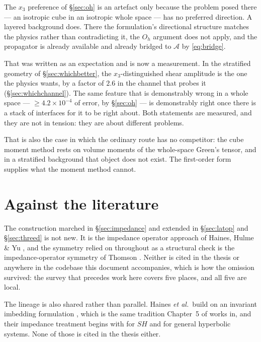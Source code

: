 \documentclass[11pt,a4paper]{article}
\newcommand{\Aop}{\mathcal{A}}
\newcommand{\Oh}{O_{h}}
\begin{document}
The $x_3$ preference of \S\ref{sec:oh} is an artefact only because the problem
posed there --- an isotropic cube in an isotropic whole space --- has no
preferred direction.  A layered background does.  There the formulation's
directional structure matches the physics rather than contradicting it, the
$\Oh$ argument does not apply, and the propagator is already available and
already bridged to $\Aop$ by \eqref{eq:bridge}.

That was written as an expectation and is now a measurement.  In the stratified
geometry of \S\ref{sec:whichbetter}, the $x_3$-distinguished shear amplitude is
the one the physics wants, by a factor of $2.6$ in the channel that probes it
(\S\ref{sec:whichchannel}).  The same feature that is demonstrably wrong in a
whole space --- $\ge4.2\times10^{-4}$ of error, by \S\ref{sec:oh} --- is
demonstrably right once there is a stack of interfaces for it to be right about.
Both statements are measured, and they are not in tension: they are about
different problems.

That is also the case in which the ordinary route has no competitor: the cube
moment method rests on volume moments of the whole-space Green's tensor, and in
a stratified background that object does not exist.  The first-order form
supplies what the moment method cannot.

\section{Against the literature}\label{sec:priorart}

The construction marched in \S\ref{sec:impedance} and extended in
\S\ref{sec:latop} and \S\ref{sec:threed} is not new.  It is the impedance
operator approach of Haines, Hulme \& Yu \cite{haines2004}, and the symmetry relied on
throughout as a structural check is the impedance-operator symmetry of Thomson
\cite{thomson2015a,thomson2015b}.  Neither is cited in the thesis or anywhere in the codebase this
document accompanies, which is how the omission survived: the survey that
precedes work here covers five places, and all five are local.

The lineage is also shared rather than parallel.  Haines \emph{et al.}\ build on an
invariant imbedding formulation \cite{bellman1959,mccoy1986}, which is the same
tradition Chapter~5 of \cite{nestor1996} works in, and their impedance treatment
begins with \cite{haines1989} for $SH$ and \cite{hainesdehoop1996} for general
hyperbolic systems.  None of those is cited in the thesis either.
\end{document}
